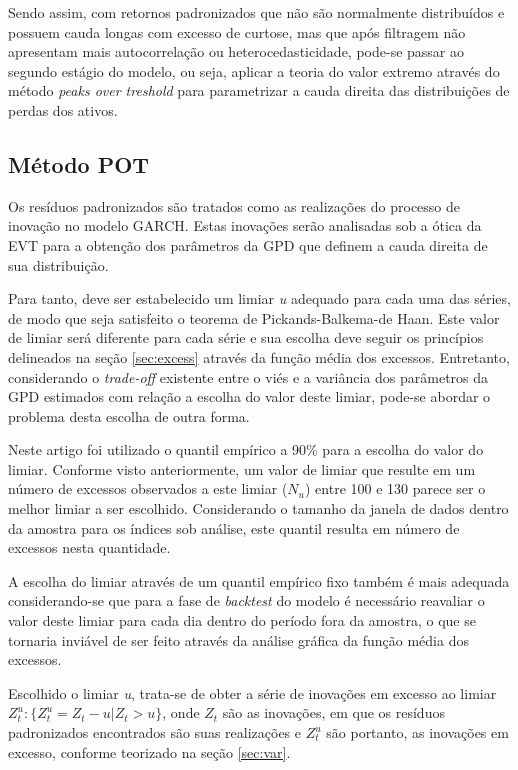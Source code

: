 \documentclass[1p]{elsarticle}
\theoremstyle{definition}
\begin{document}


Sendo assim, com retornos padronizados que não são normalmente distribuídos e possuem cauda longas com excesso de curtose, mas que após filtragem não apresentam mais autocorrelação ou heterocedasticidade, pode-se passar ao segundo estágio do modelo, ou seja, aplicar a teoria do valor extremo através do método \emph{peaks over treshold} para parametrizar a cauda direita das distribuições de perdas dos ativos.

\subsection{Método POT}
\label{sec:metpot}

Os resíduos padronizados são tratados como as realizações do processo de inovação no modelo GARCH. Estas inovações serão analisadas sob a ótica da EVT para a obtenção dos parâmetros da GPD que definem a cauda direita de sua distribuição.

Para tanto, deve ser estabelecido um limiar \emph{u} adequado para cada uma das séries, de modo que seja satisfeito o teorema de Pickands-Balkema-de Haan. Este valor de limiar será diferente para cada série e sua escolha deve seguir os princípios delineados na seção \ref{sec:excess} através da função média dos excessos. Entretanto, considerando o \emph{trade-off} existente entre o viés e a variância dos parâmetros da GPD estimados com relação a escolha do valor deste limiar, pode-se abordar o problema desta escolha de outra forma.

Neste artigo foi utilizado o quantil empírico a 90\% para a escolha do valor do limiar. Conforme visto anteriormente, um valor de limiar que resulte em um número de excessos observados a este limiar ($N_u$) entre 100 e 130 parece ser o melhor limiar a ser escolhido. Considerando o tamanho da janela de dados dentro da amostra para os índices sob análise, este quantil resulta em número de excessos nesta quantidade.

A escolha do limiar através de um quantil empírico fixo também é mais adequada considerando-se que para a fase de \emph{backtest} do modelo é necessário reavaliar o valor deste limiar para cada dia dentro do período fora da amostra, o que se tornaria inviável de ser feito através da análise gráfica da função média dos excessos.

Escolhido o limiar \emph{u}, trata-se de obter a série de inovações em excesso ao limiar $Z^u_t:\{Z^u_t = Z_t-u |Z_t > u\}$, onde $Z_t$ são as inovações, em que os resíduos padronizados encontrados são suas realizações e $Z^u_t$ são portanto, as inovações em excesso, conforme teorizado na seção \ref{sec:var}.
\end{document}
